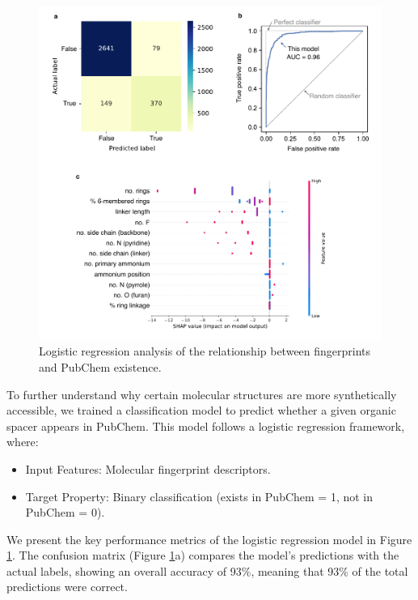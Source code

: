 \begin{figure}[htbp]
    \centering
    \includegraphics[width=\textwidth]{figures/synthesis-feasibility/figure5-3.pdf}
    \caption{Logistic regression analysis of the relationship between fingerprints and PubChem existence.}
    \label{fig:figure5.3}
\end{figure}

To further understand why certain molecular structures are more synthetically accessible, we trained a classification model to predict whether a given organic spacer appears in PubChem. This model follows a logistic regression framework, where:

\begin{itemize}
    \item Input Features: Molecular fingerprint descriptors.
    \item Target Property: Binary classification (exists in PubChem = 1, not in PubChem = 0).
\end{itemize}

We present the key performance metrics of the logistic regression model in Figure \ref{fig:figure5.3}. The confusion matrix (Figure \ref{fig:figure5.3}a) compares the model’s predictions with the actual labels, showing an overall accuracy of 93\%, meaning that 93\% of the total predictions were correct.

